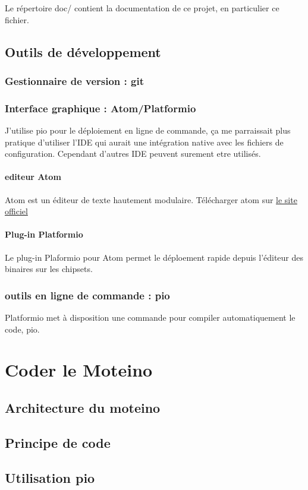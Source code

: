 \documentclass{report}
\begin{document}
Le répertoire doc/ contient la documentation de ce projet, en particulier ce fichier.

\section{Outils de développement}

\subsection{Gestionnaire de version : git}

\subsection{Interface graphique : Atom/Platformio}

J'utilise pio pour le déploiement en ligne de commande, ça me parraissait plus pratique d'utiliser l'IDE qui aurait une intégration native avec les fichiers de configuration. Cependant d'autres IDE peuvent surement etre utilisés.

\subsubsection{editeur Atom}

Atom est un éditeur de texte hautement modulaire.
Télécharger atom sur \href{https://atom.io/}{le site officiel}

\subsubsection{Plug-in Platformio}

Le plug-in Plaformio pour Atom permet le déploement rapide depuis l'éditeur des binaires sur les chipsets.

\subsection{outils en ligne de commande : pio}

Platformio met à disposition une commande pour compiler automatiquement le code, pio.

\chapter{Coder le Moteino}

\section{Architecture du moteino}

\section{Principe de code}

\section{Utilisation pio}
\end{document}
